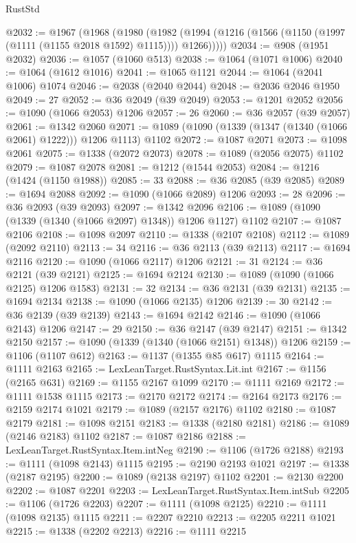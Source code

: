 \begin{lexlean}{RustStd}
\begin{coremodule}
{\begin{coremodule}
{{{{{{{{{{{{{{{{{{{{{{{{{{@2032 := @1967
    (@1968
      (@1980
        (@1982 (@1994 (@1216 (@1566 (@1150 (@1997 (@1111 (@1155 @2018 @1592) @1115)))) @1266)))))
@2034 := @908 (@1951 @2032)
@2036 := @1057 (@1060 @513)
@2038 := @1064 (@1071 @1006)
@2040 := @1064 (@1612 @1016)
@2041 := @1065 @1121
@2044 := @1064 (@2041 @1006) @1074
@2046 := @2038 (@2040 @2044)
@2048 := @2036 @2046 @1950
@2049 := 27
@2052 := @36 @2049 (@39 @2049)
@2053 := @1201 @2052
@2056 := @1090 (@1066 @2053) @1206
@2057 := 26
@2060 := @36 @2057 (@39 @2057)
@2061 := @1342 @2060
@2071 := @1089 (@1090 (@1339 (@1347 (@1340 (@1066 @2061) @1222))) @1206 @1113) @1102
@2072 := @1087 @2071
@2073 := @1098 @2061
@2075 := @1338 (@2072 @2073)
@2078 := @1089 (@2056 @2075) @1102
@2079 := @1087 @2078
@2081 := @1212 (@1544 @2053)
@2084 := @1216 (@1424 (@1150 @1988))
@2085 := 33
@2088 := @36 @2085 (@39 @2085)
@2089 := @1694 @2088
@2092 := @1090 (@1066 @2089) @1206
@2093 := 28
@2096 := @36 @2093 (@39 @2093)
@2097 := @1342 @2096
@2106 := @1089 (@1090 (@1339 (@1340 (@1066 @2097) @1348)) @1206 @1127) @1102
@2107 := @1087 @2106
@2108 := @1098 @2097
@2110 := @1338 (@2107 @2108)
@2112 := @1089 (@2092 @2110)
@2113 := 34
@2116 := @36 @2113 (@39 @2113)
@2117 := @1694 @2116
@2120 := @1090 (@1066 @2117) @1206
@2121 := 31
@2124 := @36 @2121 (@39 @2121)
@2125 := @1694 @2124
@2130 := @1089 (@1090 (@1066 @2125) @1206 @1583)
@2131 := 32
@2134 := @36 @2131 (@39 @2131)
@2135 := @1694 @2134
@2138 := @1090 (@1066 @2135) @1206
@2139 := 30
@2142 := @36 @2139 (@39 @2139)
@2143 := @1694 @2142
@2146 := @1090 (@1066 @2143) @1206
@2147 := 29
@2150 := @36 @2147 (@39 @2147)
@2151 := @1342 @2150
@2157 := @1090 (@1339 (@1340 (@1066 @2151) @1348)) @1206
@2159 := @1106 (@1107 @612)
@2163 := @1137 (@1355 @85 @617) @1115
@2164 := @1111 @2163
@2165 := LexLeanTarget.RustSyntax.Lit.int
@2167 := @1156 (@2165 @631)
@2169 := @1155 @2167 @1099
@2170 := @1111 @2169
@2172 := @1111 @1538 @1115
@2173 := @2170 @2172
@2174 := @2164 @2173
@2176 := @2159 @2174 @1021
@2179 := @1089 (@2157 @2176) @1102
@2180 := @1087 @2179
@2181 := @1098 @2151
@2183 := @1338 (@2180 @2181)
@2186 := @1089 (@2146 @2183) @1102
@2187 := @1087 @2186
@2188 := LexLeanTarget.RustSyntax.Item.intNeg
@2190 := @1106 (@1726 @2188)
@2193 := @1111 (@1098 @2143) @1115
@2195 := @2190 @2193 @1021
@2197 := @1338 (@2187 @2195)
@2200 := @1089 (@2138 @2197) @1102
@2201 := @2130 @2200
@2202 := @1087 @2201
@2203 := LexLeanTarget.RustSyntax.Item.intSub
@2205 := @1106 (@1726 @2203)
@2207 := @1111 (@1098 @2125)
@2210 := @1111 (@1098 @2135) @1115
@2211 := @2207 @2210
@2213 := @2205 @2211 @1021
@2215 := @1338 (@2202 @2213)
@2216 := @1111 @2215
}}}}}}}}}}}}}}}}}}}}}}}}}}
\end{coremodule}}
\end{coremodule}
\end{lexlean}
